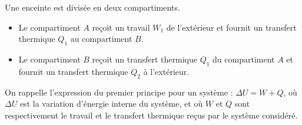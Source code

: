 
\finEntrainement






\hauteurLargeurCadreReponse		{8mm}{4cm}
\typeEntrainement				{} %
\initialisationEntrainement



                                \initialisationPartieGauche %
\smallskip
Une enceinte est divisée en deux compartiments.
\begin{itemize}
\item
Le compartiment $A$ reçoit un travail $W_1$ de l'extérieur et fournit un transfert thermique $Q_1$ au compartiment $B$. 

\item
Le compartiment $B$ reçoit un transfert thermique $Q_1$ du compartiment $A$ et fournit un transfert thermique $Q_2$ à l'extérieur.
\end{itemize}

On rappelle l'expression du premier principe pour un système : $\Delta U = W+Q$,
où $\Delta U$ est la variation d'énergie interne du système, et où $W$ et $Q$ sont respectivement le travail et le transfert thermique reçus par le système considéré.

